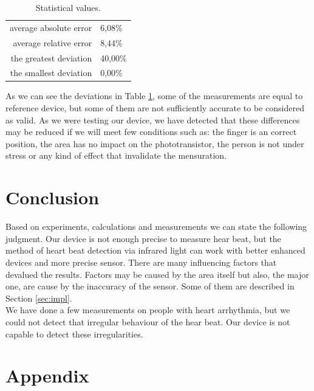 \documentclass[11pt,a4paper]{article}
\begin{document}
\begin{table}[H]
  \begin{center}
    \begin{tabular}{r|l}
      average absolute error & 6,08\%\\
      average relative error & 8,44\%\\
      the greatest deviation & 40,00\%\\
      the smallest deviation & 0,00\%\\
    \end{tabular}
    \label{tab:stats}
    \caption{Statistical values.}
  \end{center}
\end{table}

As we can see the deviations in Table \ref{tab:stats}, some of the measurements are equal to reference device, but some of them are not sufficiently accurate to be considered as valid. As we were testing our device, we have detected that these differences may be reduced if we will meet few conditions such as: the finger is an correct position, the area has no impact on the phototransistor, the person is not under stress or any kind of effect that invalidate the mensuration.

\section{Conclusion}
Based on experiments, calculations and measurements we can state the following judgment. Our device is not enough precise to measure hear beat, but the method of heart beat detection via infrared light can work with better enhanced devices and more precise sensor. There are many influencing factors that devalued the results. Factors may be caused by the area itself but also, the major one, are cause by the inaccuracy of the sensor. Some of them are described in Section \ref{sec:impl}.\\

We have done a few measurements on people with heart arrhythmia, but we could not detect that irregular behaviour of the hear beat. Our device is not capable to detect these irregularities.

\newpage

\section{Appendix}
\end{document}
